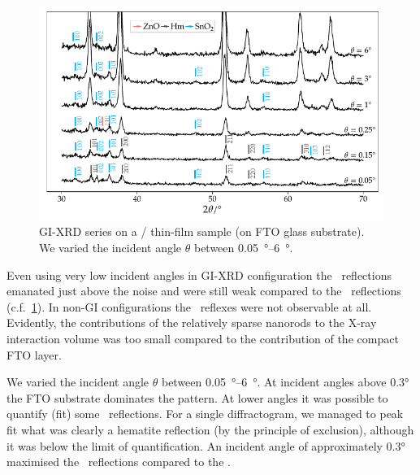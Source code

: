 \documentclass[draft,webedition,openright,titles,swedish,english]{LuaUUThesis}\usepackage[]{graphicx}\usepackage[]{xcolor}
\newenvironment{knitrout}{}{} %
\newcommand{\cf}{c.f.}
\begin{document}
\begin{figure}[tbp]
\centering
\begin{knitrout}\scriptsize
{}\color{fgcolor}

{\centering \includegraphics[width=4.72in]{figure/0503P-fig-gixrd-exp-1} 

}


\end{knitrout}
\caption[GI-XRD /]{%
   GI-XRD series on a / thin-film sample (on \gls{FTO} glass substrate).
   We varied the incident angle $\theta$ between
   \qtyrange[range-phrase=\ensuremath{\text{ and }}]{0.05}{6}{\degree}.
}
\label{fig:P03-gixrd-exp}
\end{figure}

Even using very low incident angles in \gls{GI-XRD} configuration
the \ZnO\ reflections emanated just above the noise and were still weak compared to
the \tinox\ reflections (\cf\ \cref{fig:P03-gixrd-exp}).
In non-GI configurations the \ZnO\ reflexes were not observable at all.
Evidently, the contributions of the relatively sparse nanorods
to the X-ray interaction volume
was too small compared to the contribution of the compact \gls{FTO} layer.

We varied the incident angle $\theta$ between
\qtyrange[range-phrase=\ensuremath{\text{ and }}]{0.05}{6}{\degree}.
At incident angles above \ang{0.3} the \gls{FTO} substrate dominates the pattern.
At lower angles it was possible to quantify (fit) some \zincox\ reflections.
For a single diffractogram, we managed to peak fit what was clearly a \gls{hematite}
reflection (by the principle of exclusion), although it was below the limit of
quantification.
An incident angle of approximately \ang{0.3}
maximised the \ZnO\ reflections compared to the \tinox.
\end{document}
